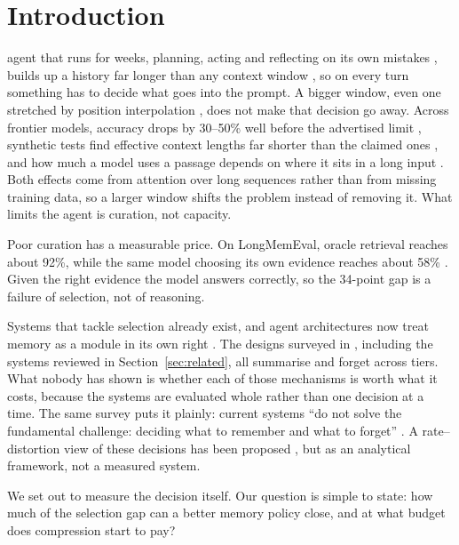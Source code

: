 \section{Introduction}

 agent that runs for weeks, planning, acting and
reflecting on its own mistakes
\cite{yao2023react,shinn2023reflexion,wang2024agentsurvey,xi2023agentsurvey},
builds up a history far longer than any context window
\cite{brown2020gpt3}, so on every turn something has to decide what goes
into the prompt. A bigger window, even one stretched by position
interpolation \cite{peng2024yarn}, does not make that decision go away.
Across frontier models, accuracy drops by 30--50\% well before the
advertised limit \cite{chroma2025contextrot}, synthetic tests find effective
context lengths far shorter than the claimed ones \cite{hsieh2024ruler}, and
how much a model uses a passage depends on where it sits in a long input
\cite{liu2024lostmiddle}.
Both effects come from attention over long sequences rather than from missing
training data, so a larger window shifts the problem instead of removing it.
What limits the agent is curation, not capacity.

Poor curation has a measurable price. On LongMemEval, oracle retrieval reaches
about 92\%, while the same model choosing its own evidence reaches about 58\%
\cite{wu2024longmemeval}. Given the right evidence the model answers
correctly, so the 34-point gap is a failure of selection, not of reasoning.

Systems that tackle selection already exist, and agent architectures now treat
memory as a module in its own right \cite{sumers2024coala}. The designs
surveyed in \cite{zhang2024memorysurvey}, including the systems reviewed in
Section~\ref{sec:related}, all summarise and forget across tiers. What nobody has shown is whether each of those mechanisms is worth what
it costs, because the systems are evaluated whole rather than one decision at
a time. The same survey puts it plainly: current systems ``do not solve the
fundamental challenge: deciding what to remember and what to forget''
\cite{zhang2024memorysurvey}. A rate--distortion view
\cite{shannon1959rd,cover2006elements} of these decisions has been proposed
\cite{colaco2026rd}, but as an analytical framework, not a measured system.

We set out to measure the decision itself. Our question is simple to state:
how much of the selection gap can a better memory policy close, and at what
budget does compression start to pay?


